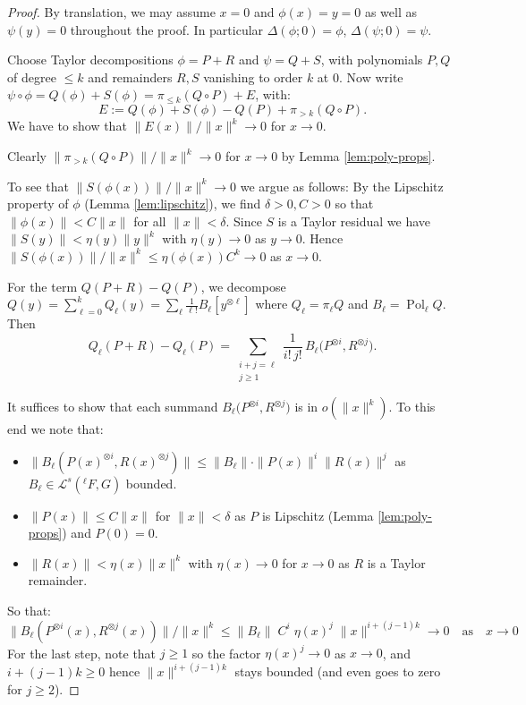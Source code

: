 \documentclass[10pt,a4paper]{article}
\theoremstyle{plain}
\theoremstyle{definition}
\newcommand{\1}{\mathbb{1}} %
\newcommand{\ra}{\rightarrow} %
\newcommand{\tensor}{\otimes} %
\newcommand{\KL}{\mathcal{L}}
\newcommand{\qtext}[1]{\quad\text{#1}\quad} %
\newcommand{\tightlist}{\setlength{\itemsep}{0pt}\setlength{\parskip}{0pt}}
\DeclareMathOperator{\Pol}{Pol} %
\begin{document}
\begin{proof}

By translation, we may assume \(x=0\) and \(\phi(x) = y = 0\) as well as
\(\psi(y) = 0\) throughout the proof. In particular
\(\Delta(\phi; 0) = \phi\), \(\Delta(\psi; 0) = \psi\).

Choose Taylor decompositions \(\phi = P + R\) and \(\psi = Q + S\), with
polynomials \(P,Q\) of degree \(\le k\) and remainders \(R,S\) vanishing
to order \(k\) at \(0\). Now write
\(\psi\circ\phi = Q(\phi) + S(\phi)=\pi_{\le k}(Q\circ P) + E\), with:
\[
  E := Q(\phi) + S(\phi) - Q(P) + \pi_{> k}(Q\circ P).
\] We have to show that \(\|E(x)\| / \|x\|^k \to 0\) for \(x \to 0\).

Clearly \(\| \pi_{> k}(Q\circ P) \| / \|x\|^k \to 0\) for \(x \to 0\) by
Lemma \ref{lem:poly-props}.

To see that \(\|S(\phi(x))\|/\|x\|^k \to 0\) we argue as follows: By the
Lipschitz property of \(\phi\) (Lemma \ref{lem:lipschitz}), we find
\(\delta > 0, C > 0\) so that \(\|\phi(x)\| < C \|x\|\) for all
\(\|x\| < \delta\). Since \(S\) is a Taylor residual we have
\(\|S(y)\| < \eta(y) \|y\|^k\) with \(\eta(y) \to 0\) as \(y \to 0\).
Hence \(\|S(\phi(x))\|/\|x\|^k \leq \eta(\phi(x)) C^k \to 0\) as
\(x \to 0\).

For the term \(Q(P+R) - Q(P)\), we decompose
\(Q(y) = \sum_{\ell=0}^k Q_\ell(y) = \sum_\ell \frac{1}{\ell!} B_\ell[y^{\tensor \ell}]\)
where \(Q_\ell = \pi_\ell Q\) and \(B_\ell = \Pol_\ell Q\). Then \[
  Q_\ell(P+R) - Q_\ell(P)
  = \sum_{\substack{i+j=\ell\\ j\ge1}} \frac{1}{i!\,j!}\,B_\ell\big(P^{\tensor i}, R^{\tensor j}\big).
\]

It suffices to show that each summand
\(B_\ell\big(P^{\tensor i}, R^{\tensor j})\) is in \(o(\|x\|^k)\). To
this end we note that:

\begin{itemize}
\tightlist
\item
  \(\|B_\ell(P(x)^{\tensor i}, R(x)^{\tensor j})\| \leq \|B_\ell\| \cdot \|P(x)\|^i \|R(x)\|^j\)
  as \(B_\ell \in \KL^s(^\ell F,G)\) bounded.
\item
  \(\|P(x)\| \le C\|x\|\) for \(\|x\| < \delta\) as \(P\) is Lipschitz
  (Lemma \ref{lem:poly-props}) and \(P(0) = 0\).
\item
  \(\|R(x)\| < \eta(x) \|x\|^k\) with \(\eta(x) \ra 0\) for \(x \to 0\)
  as \(R\) is a Taylor remainder.
\end{itemize}

So that: \[
  \|B_\ell(P^{\tensor i}(x),R^{\tensor j}(x))\| / \|x\|^k
  \leq
  \|B_\ell\| \; C^i \; \eta(x)^j \; \|x\|^{i + (j - 1) k}
  \to 0 \qtext{as} x \to 0
\] For the last step, note that \(j \geq 1\) so the factor
\(\eta(x)^j \to 0\) as \(x \to 0\), and \(i + (j - 1) k \geq 0\) hence
\(\|x\|^{i + (j - 1) k}\) stays bounded (and even goes to zero for
\(j \geq 2\)).

\end{proof}
\end{document}
